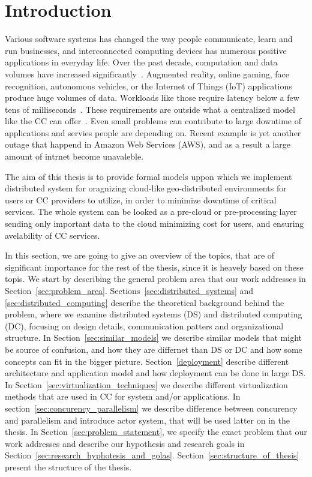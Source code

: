 \pagestyle{fancy}
\fancyhf{}
\fancyhead[RE,LO]{\leftmark}
\fancyfoot[CE,CO]{\thepage}
\chapter{Introduction}\label{chapter:Intro}
%
Various software systems has changed the way people communicate, learn and run businesses, and interconnected computing devices has numerous positive applications in everyday life. Over the past decade, computation and data volumes have increased significantly~\cite{ChiangZ16}. Augmented reality, online gaming, face recognition, autonomous vehicles, or the Internet of Things (IoT) applications produce huge volumes of data. Workloads like those require latency below a few tens of milliseconds~\cite{ChiangZ16}. These requirements are outside what a centralized model like the CC can offer~\cite{ChiangZ16}. Even small problems can contribute to large downtime of applications and servies people are depending on. Recent example is yet another outage that happend in Amazon Web Services (AWS), and as a result a large amount of intrnet become unavaleble.

The aim of this thesis is to provide formal models uppon which we implement distributed system for oragnizing cloud-like geo-distributed environments for users or CC providers to utilize, in order to minimize downtime of critical services. The whole system can be looked as a pre-cloud or pre-processing layer sending only important data to the cloud minimizing cost for users, and ensuring avelability of CC services.

In this section, we are going to give an overview of the topics, that are of significant importance for the rest of the thesis, since it is heavely based on these topis. We start by describing the general problem area that our work addresses in Section~\ref{sec:problem_area}. Sections~\ref{sec:distributed_systems} and \ref{sec:distributed_computing} describe the theoretical background behind the problem, where we examine distributed systems (DS) and distributed computing (DC), focusing on design details, communication patters and organizational structure. In Section~\ref{sec:similar_models} we describe similar models that might be source of confusion, and how they are differnet than DS or DC and how some concepts can fit in the bigger picture. Section~\ref{deployment} describe different architecture and application model and how deployment can be done in large DS. In Section~\ref{sec:virtualization_techniques} we describe different virtualization methods that are used in CC for system and/or applications. In section~\ref{sec:concurency_parallelism} we describe difference between concurency and parallelism and introduce actor system, that will be used latter on in the thesis. In Section~\ref{sec:problem_statement}, we specify the exact problem that our work addresses and describe our hypothesis and research goals in Section~\ref{sec:research_hyphotesis_and_golas}. Section~\ref{sec:structure_of_thesis} present the structure of the thesis.
%
%
%
